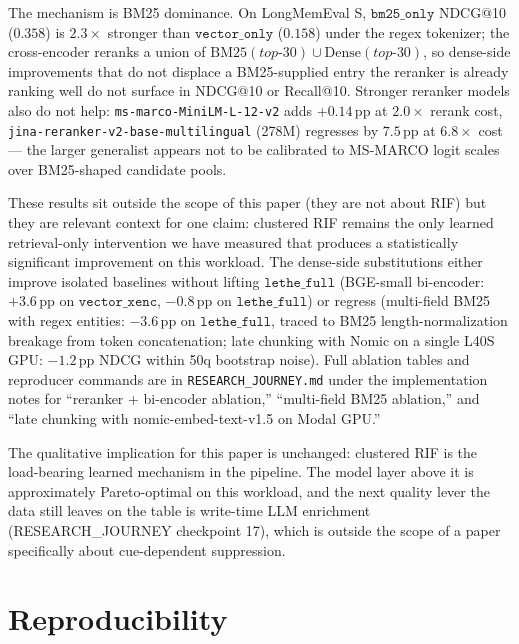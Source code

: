 \documentclass[11pt,a4paper]{article}
\begin{document}
The mechanism is BM25 dominance. On LongMemEval S, $\texttt{bm25\_only}$ NDCG@10 ($0.358$) is $2.3\times$ stronger than $\texttt{vector\_only}$ ($0.158$) under the regex tokenizer; the cross-encoder reranks a union of $\mathrm{BM25}(top\text{-}30) \cup \mathrm{Dense}(top\text{-}30)$, so dense-side improvements that do not displace a BM25-supplied entry the reranker is already ranking well do not surface in NDCG@10 or Recall@10. Stronger reranker models also do not help: \texttt{ms-marco-MiniLM-L-12-v2} adds $+0.14\,\mathrm{pp}$ at $2.0\times$ rerank cost, \texttt{jina-reranker-v2-base-multilingual} (278M) regresses by $7.5\,\mathrm{pp}$ at $6.8\times$ cost — the larger generalist appears not to be calibrated to MS-MARCO logit scales over BM25-shaped candidate pools.

These results sit outside the scope of this paper (they are not about RIF) but they are relevant context for one claim: clustered RIF remains the only learned retrieval-only intervention we have measured that produces a statistically significant improvement on this workload. The dense-side substitutions either improve isolated baselines without lifting $\texttt{lethe\_full}$ (BGE-small bi-encoder: $+3.6\,\mathrm{pp}$ on $\texttt{vector\_xenc}$, $-0.8\,\mathrm{pp}$ on $\texttt{lethe\_full}$) or regress (multi-field BM25 with regex entities: $-3.6\,\mathrm{pp}$ on $\texttt{lethe\_full}$, traced to BM25 length-normalization breakage from token concatenation; late chunking with Nomic on a single L40S GPU: $-1.2\,\mathrm{pp}$ NDCG within 50q bootstrap noise). Full ablation tables and reproducer commands are in \texttt{RESEARCH\_JOURNEY.md} under the implementation notes for ``reranker + bi-encoder ablation,'' ``multi-field BM25 ablation,'' and ``late chunking with nomic-embed-text-v1.5 on Modal GPU.''

The qualitative implication for this paper is unchanged: clustered RIF is the load-bearing learned mechanism in the pipeline. The model layer above it is approximately Pareto-optimal on this workload, and the next quality lever the data still leaves on the table is write-time LLM enrichment (RESEARCH\_JOURNEY checkpoint 17), which is outside the scope of a paper specifically about cue-dependent suppression.

\section*{Reproducibility}
\end{document}
